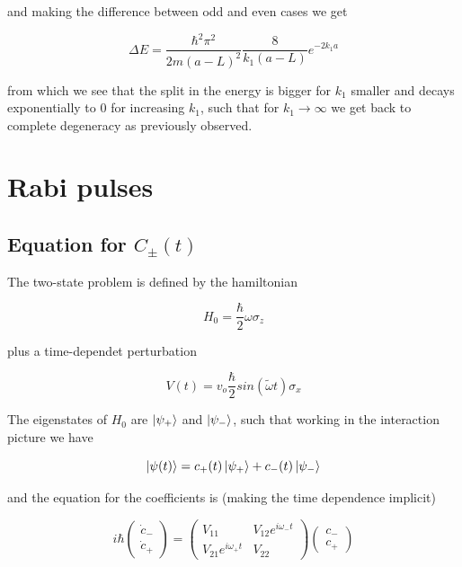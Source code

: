 \documentclass{article}
\begin{document}
and making the difference between odd and even cases we get

\begin{equation}
\Delta E = \frac{\hbar^2 \pi^2}{2m(a-L)^2} \frac{8}{k_1(a-L)} e^{-2k_1a}
\end{equation}

from which we see that the split in the energy is bigger for \(k_1\) smaller and decays exponentially to \(0\) for increasing \(k_1\), such that for \(k_1 \rightarrow \infty\) we get back to complete degeneracy as previously observed.

\section{Rabi pulses}

\subsection{Equation for \(C_{\pm}(t) \)}
The two-state problem is defined by the hamiltonian

\begin{equation}
H_0 = \frac{\hbar}{2} \omega \sigma_z
\end{equation}

plus a time-dependet perturbation

\begin{equation}
V(t) = v_o \frac{\hbar}{2} sin(\tilde{\omega} t) \sigma_x
\end{equation}

The eigenstates of \(H_0\) are \( \ket{\psi_+} \) and \( \ket{\psi_-} \), such that working in the interaction picture we have

\begin{equation}
\ket{\psi(t)} = c_+(t) \ket{\psi_+} + c_-(t) \ket{\psi_-}
\end{equation}

and the equation for the coefficients is (making the time dependence implicit)

\begin{equation}
i\hbar
  \begin{pmatrix}
    \dot{c}_- \\
    \dot{c}_+
  \end{pmatrix}
=
  \begin{pmatrix}
    V_{11} & V_{12}e^{i \omega_- t} \\
    V_{21}e^{i \omega_+ t} & V_{22}
  \end{pmatrix}
  \begin{pmatrix}
    c_- \\
    c_+
  \end{pmatrix}
\end{equation}
\end{document}
